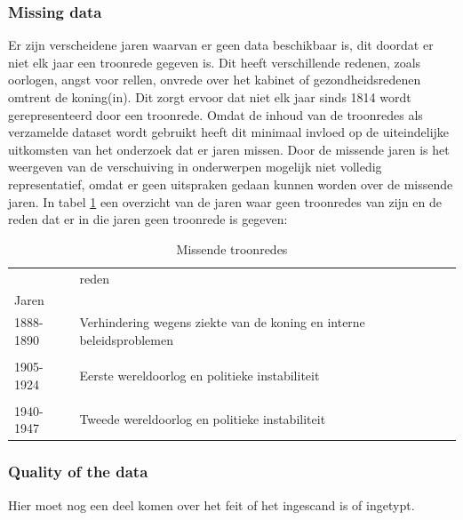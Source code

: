 \subsubsection{Missing data}
Er zijn verscheidene jaren waarvan er geen data beschikbaar is, dit doordat er niet elk jaar een troonrede gegeven is. Dit heeft verschillende redenen, zoals oorlogen, angst voor rellen, onvrede over het kabinet of gezondheidsredenen omtrent de koning(in). Dit zorgt ervoor dat niet elk jaar sinds 1814 wordt gerepresenteerd door een troonrede. Omdat de inhoud van de troonredes als verzamelde dataset wordt gebruikt heeft dit minimaal invloed op de uiteindelijke uitkomsten van het onderzoek dat er jaren missen. Door de missende jaren is het weergeven van de verschuiving in onderwerpen mogelijk niet volledig representatief, omdat er geen uitspraken gedaan kunnen worden over de missende jaren.
In tabel \ref{missing} een overzicht van de jaren waar geen troonredes van zijn en de reden dat er in die jaren geen troonrede is gegeven:
\newline
\newline
\begin{table}[htb]
\centering
\begin{tabular}{ll}
\toprule
{} &                       reden \\
Jaren     &                             \\
\midrule
1888-1890 &  Verhindering wegens ziekte van de koning en interne beleidsproblemen\\
\\
1905-1924 &         Eerste wereldoorlog en politieke instabiliteit\\
\\
1940-1947 &         Tweede wereldoorlog en politieke instabiliteit\\
\bottomrule
\end{tabular}
\caption{Missende troonredes}
\label{missing}
\end{table}


\subsubsection{Quality of the data}
Hier moet nog een deel komen over het feit of het ingescand is of ingetypt.

